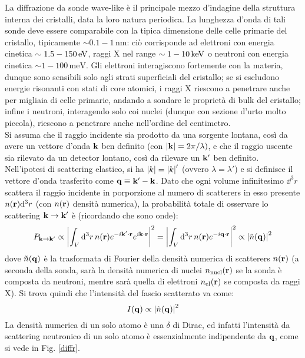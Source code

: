 La diffrazione da sonde wave-like è il principale mezzo d'indagine della struttura interna dei cristalli, data la loro natura periodica. La lunghezza d'onda di tali sonde deve essere comparabile con la tipica dimensione delle celle primarie del cristallo, tipicamente $ \sim 0.1 - 1 \,\text{nm} $: ciò corrisponde ad elettroni con energia cinetica $ \sim 1.5 - 150 \,\mathrm{eV} $, raggi X nel range $ \sim 1 - 10 \,\mathrm{keV} $ o neutroni con energia cinetica $ \sim 1 - 100 \,\text{meV} $. Gli elettroni interagiscono fortemente con la materia, dunque sono sensibili solo agli strati superficiali del cristallo; se si escludono energie risonanti con stati di core atomici, i raggi X riescono a penetrare anche per migliaia di celle primarie, andando a sondare le proprietà di bulk del cristallo; infine i neutroni, interagendo solo coi nuclei (dunque con sezione d'urto molto piccola), riescono a penetrare anche nell'ordine del centimetro. \\
Si assuma che il raggio incidente sia prodotto da una sorgente lontana, così da avere un vettore d'onda $ \mathbf{k} $ ben definito (con $ \left\lvert\mathbf{k}\right\rvert = 2\pi/\lambda) $, e che il raggio uscente sia rilevato da un detector lontano, così da rilevare un $ \mathbf{k}' $ ben definito. Nell'ipotesi di scattering elastico, si ha $ \left\lvert k\right\rvert = \left\lvert k\right\rvert' $ (ovvero $ \lambda = \lambda' $) e si definisce il vettore d'onda trasferito come $ \mathbf{q} \equiv \mathbf{k}' - \mathbf{k} $. Dato che ogni volume infinitesimo $ \dd^3r $ scattera il raggio incidente in porporzione al numero di scatterers in esso presente $ n(\mathbf{r}) \mathrm{d}^3r $ (con $ n(\mathbf{r}) $ densità numerica), la probabilità totale di osservare lo scattering $ \mathbf{k} \rightarrow \mathbf{k}' $ è (ricordando che sono onde):
\begin{equation*}
	P_{\mathbf{k} \rightarrow \mathbf{k}'} \propto \left\lvert\int_V \mathrm{d}^3r\, n(\mathbf{r}) e^{-i \mathbf{k}' \cdot \mathbf{r}} e^{i \mathbf{k} \cdot \mathbf{r}}\right\rvert^2 = \left\lvert\int_V \mathrm{d}^3r\, n(\mathbf{r}) e^{-i \mathbf{q} \cdot \mathbf{r}}\right\rvert^2 \propto \left\lvert\tilde{n}(\mathbf{q})\right\rvert^2
\end{equation*}
dove $ \tilde{n}(\mathbf{q}) $ è la trasformata di Fourier della densità numerica di scatterers $ n(\mathbf{r}) $ (a seconda della sonda, sarà la densità numerica di nuclei $ n_\text{nucl}(\mathbf{r}) $ se la sonda è composta da neutroni, mentre sarà quella di elettroni $ n_\text{el}(\mathbf{r}) $ se composta da raggi X). Si trova quindi che l'intensità del fascio scatterato va come:
\begin{equation}
	I(\mathbf{q}) \propto \left\lvert\tilde{n}(\mathbf{q})\right\rvert^2
\end{equation}
La densità numerica di un solo atomo è una $ \delta $ di Dirac, ed infatti l'intensità da scattering neutronico di un solo atomo è essenzialmente indipendente da $ \mathbf{q} $, come si vede in Fig. \ref{diffr}. \\
